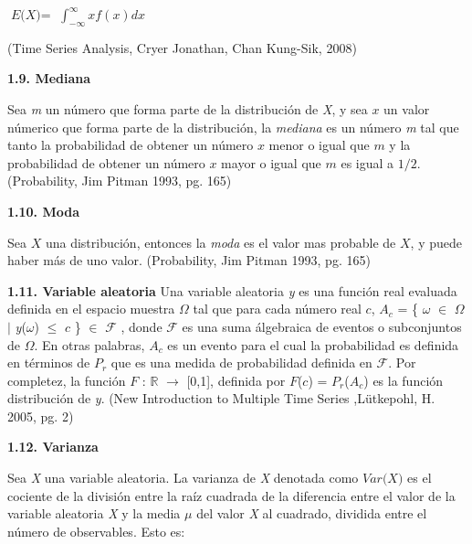 \begin{center}
$\textit{E(X)} =$ $\int_{-\infty}^{\infty} x f(x) dx $
\end{center}
(Time Series Analysis, Cryer Jonathan, Chan Kung-Sik, 2008)
\newline

{
\noindent
\Large  \textbf{1.9. Mediana} 
}

Sea \textit{m} un número que forma parte de la distribución de \textit{X}, y sea $\textit{x}$ un valor númerico que forma parte de la distribución, la \textit{mediana} es un número \textit{m} tal que tanto la probabilidad de obtener un número $\textit{x}$ menor o igual que $\textit{m}$ y la probabilidad de obtener un número $\textit{x}$ mayor o igual que $\textit{m}$ es igual a $1/2$. (Probability, Jim Pitman 1993, pg. 165)
\newline

{
\noindent
\Large  \textbf{1.10. Moda} 
}

Sea $\textit{X}$ una distribución, entonces la \textit{moda} es el valor mas probable de $\textit{X}$, y puede haber más de uno valor. (Probability, Jim Pitman 1993, pg. 165)
\newline

{
\noindent
\Large  \textbf{1.11. Variable aleatoria} 
}
\newline
Una variable aleatoria \textit{y} es una función real evaluada definida en el espacio muestra $\mathit{\Omega}$ tal que para cada número real $\mathit{c}$, $A_{c}$ =  \{ $\omega$ $\in$ $\Omega$ $\mid$ \textit{y}($\omega$) $\leq$ $\mathit{c}$ \} $\in$  $\mathcal{F}$ , donde $\mathcal{F}$ es una suma álgebraica de eventos o subconjuntos de $\mathit{\Omega}$. En otras palabras, $A_{c}$ es un evento para el cual la probabilidad es definida en términos de $P_{r}$ que es una medida de probabilidad definida en $\mathcal{F}$. Por completez, la función $\mathit{F}$ : $\mathbb{R}$ $ \rightarrow$ [0,1], definida por $\mathit{F}$($\mathit{c}$) = $P_{r}$($A_{c}$) es la función distribución de  \textit{y}. (New Introduction to Multiple Time Series ,L\"{u}tkepohl, H. 2005, pg. 2)
\newline

{
\noindent
\Large  \textbf{1.12. Varianza} 
}

Sea \textit{X} una variable aleatoria. La varianza de \textit{X} denotada como $\textit{Var(X)}$  es el cociente de la división entre la raíz cuadrada de la diferencia entre el valor de la variable aleatoria \textit{X} y la media $\mu$ del valor \textit{X} al cuadrado, dividida entre el número de observables. Esto es:

